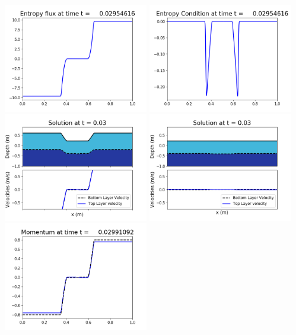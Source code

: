 \documentclass[11pt]{article}
\begin{document}
\includegraphics[width=0.475\textwidth]{frame0082fig1008.png}
\vskip 10pt 
\includegraphics[width=0.475\textwidth]{frame0082fig1009.png}
\vskip 10pt 
\includegraphics[width=0.475\textwidth]{frame0083fig1001.png}
\includegraphics[width=0.475\textwidth]{frame0083fig1002.png}
\vskip 10pt 
\includegraphics[width=0.475\textwidth]{frame0083fig1003.png}
\end{document}
